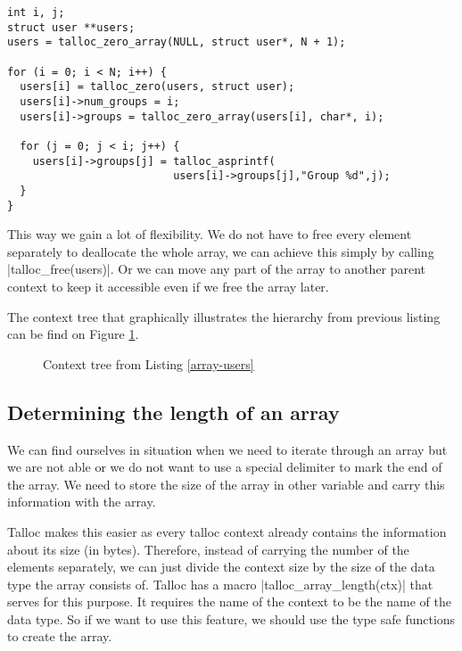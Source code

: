 \begin{lstlisting}[caption={Array of users and context hierarchy},
label={array-users}] int i, j;
struct user **users;
users = talloc_zero_array(NULL, struct user*, N + 1);

for (i = 0; i < N; i++) {
  users[i] = talloc_zero(users, struct user);
  users[i]->num_groups = i;
  users[i]->groups = talloc_zero_array(users[i], char*, i);
  
  for (j = 0; j < i; j++) {
    users[i]->groups[j] = talloc_asprintf(
                          users[i]->groups[j],"Group %d",j);
  }
}
\end{lstlisting}

This way we gain a lot of flexibility. We do not have to free every element
separately to deallocate the whole array, we can achieve this simply by calling
|talloc_free(users)|. Or we can move any part of the array to another parent
context to keep it accessible even if we free the array later.

The context tree that graphically illustrates the hierarchy from previous
listing can be find on Figure \ref{fig:context-tree-array}.

\begin{figure}[H]
  \centering
  
  \caption{Context tree from Listing \ref{array-users}}
  \label{fig:context-tree-array}
\end{figure}

\subsection{Determining the length of an array}

We can find ourselves in situation when we need to iterate through an array but
we are not able or we do not want to use a special delimiter to mark the end of
the array. We need to store the size of the array in other variable and carry
this information with the array.

Talloc makes this easier as every talloc context already contains the
information about its size (in bytes). Therefore, instead of carrying the number
of the elements separately, we can just divide the context size by the size of
the data type the array consists of. Talloc has a macro
|talloc_array_length(ctx)| that serves for this purpose. It requires the name of
the context to be the name of the data type. So if we want to use this feature,
we should use the type safe functions to create the array.

